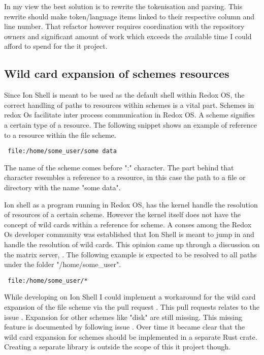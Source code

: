 
In my view the best solution is to rewrite the tokenisation and parsing.
This rewrite should make token/language items linked to their respective column and line number.
That refactor however requires coordination with the repository owners and significant amount of work
which exceeds the available time I could afford to spend for the it project.

\subsection{Wild card expansion of schemes resources}

Since Ion Shell is meant to be used as the default shell within Redox OS,
the correct handling of paths to resources within schemes is a vital part.
Schemes in redox Os facilitate inter process communication in Redox OS.
A scheme signifies a certain type of a resource.
The following snippet shows an example of reference to a resource within the file scheme.
\begin{verbatim}
 file:/home/some_user/some data
\end{verbatim}
The name of the scheme comes before ":" character.
The part behind that character resembles a reference to a resource,
in this case the path to a file or directory with the name "some data".

Ion shell as a program running in Redox OS, has the kernel
handle the resolution of resources of a certain scheme.
However the kernel itself does not have the concept of wild cards within a reference for scheme.
A conses among the Redox Os developer community was established
that Ion Shell is meant to jump in and handle the resolution of wild cards.
This opinion came up through a discussion on the matrix server, \cite{matrix_channel}.
The following example is expected to be resolved to all paths under the folder "/home/some\_user".
\begin{verbatim}
 file:/home/some_user/*
\end{verbatim}

While developing on Ion Shell I could implement a workaround for the wild card expansion of the file scheme
via the pull request \cite{pr_file_scheme} .
This pull requests relates to the issue \cite{issue_file_scheme}.
Expansion for other schemes like "disk" are still missing.
This missing feature is documented by following issue \cite{issue_disk_scheme}.
Over time it became clear that the wild card expansion for schemes
should be implemented in a separate Rust crate.
Creating a separate library is outside the scope of this it project though.

